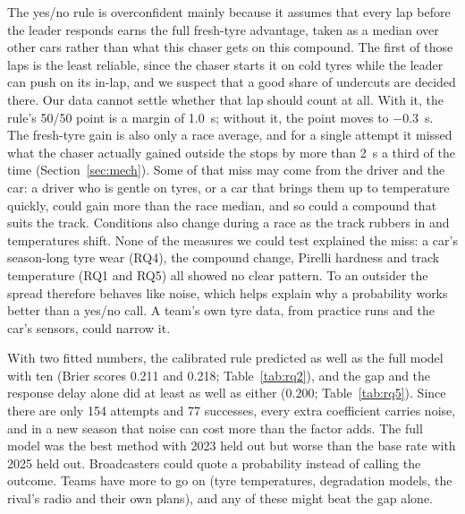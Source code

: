 
The yes/no rule is overconfident mainly because it assumes that every lap before the leader responds earns the full fresh-tyre advantage, taken as a median over other cars rather than what this chaser gets on this compound. The first of those laps is the least reliable, since the chaser starts it on cold tyres while the leader can push on its in-lap, and we suspect that a good share of undercuts are decided there. Our data cannot settle whether that lap should count at all. With it, the rule's 50/50 point is a margin of 1.0~s; without it, the point moves to $-0.3$~s. The fresh-tyre gain is also only a race average, and for a single attempt it missed what the chaser actually gained outside the stops by more than 2~s a third of the time (Section~\ref{sec:mech}). Some of that miss may come from the driver and the car: a driver who is gentle on tyres, or a car that brings them up to temperature quickly, could gain more than the race median, and so could a compound that suits the track. Conditions also change during a race as the track rubbers in and temperatures shift. None of the measures we could test explained the miss: a car's season-long tyre wear (RQ4), the compound change, Pirelli hardness and track temperature (RQ1 and RQ5) all showed no clear pattern. To an outsider the spread therefore behaves like noise, which helps explain why a probability works better than a yes/no call. A team's own tyre data, from practice runs and the car's sensors, could narrow it.

With two fitted numbers, the calibrated rule predicted as well as the full model with ten (Brier scores 0.211 and 0.218; Table~\ref{tab:rq2}), and the gap and the response delay alone did at least as well as either (0.200; Table~\ref{tab:rq5}). Since there are only 154 attempts and 77 successes, every extra coefficient carries noise, and in a new season that noise can cost more than the factor adds. The full model was the best method with 2023 held out but worse than the base rate with 2025 held out. Broadcasters could quote a probability instead of calling the outcome. Teams have more to go on (tyre temperatures, degradation models, the rival's radio and their own plans), and any of these might beat the gap alone.

